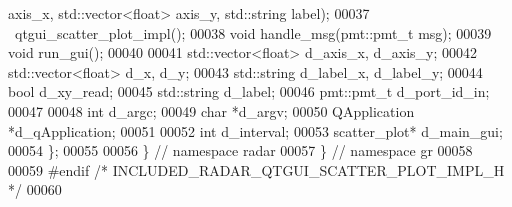 \begin{DoxyCode}
      axis\_x, std::vector<float> axis\_y, std::string label);
00037       ~qtgui_scatter_plot_impl();
00038       \textcolor{keywordtype}{void} handle_msg(pmt::pmt\_t msg);
00039       \textcolor{keywordtype}{void} run_gui();
00040       
00041       std::vector<float> d_axis_x, d_axis_y;
00042       std::vector<float> d_x, d_y;
00043       std::string d_label_x, d_label_y;
00044       \textcolor{keywordtype}{bool} d_xy_read;
00045       std::string d_label;
00046       pmt::pmt\_t d_port_id_in;
00047       
00048       \textcolor{keywordtype}{int} d_argc;
00049       \textcolor{keywordtype}{char} *d_argv;
00050       QApplication *d_qApplication;
00051       
00052       \textcolor{keywordtype}{int} d_interval;
00053       scatter_plot* d_main_gui;
00054     \};
00055 
00056   \} \textcolor{comment}{// namespace radar}
00057 \} \textcolor{comment}{// namespace gr}
00058 
00059 \textcolor{preprocessor}{#endif }\textcolor{comment}{/* INCLUDED\_RADAR\_QTGUI\_SCATTER\_PLOT\_IMPL\_H */}\textcolor{preprocessor}{}
00060 
\end{DoxyCode}
